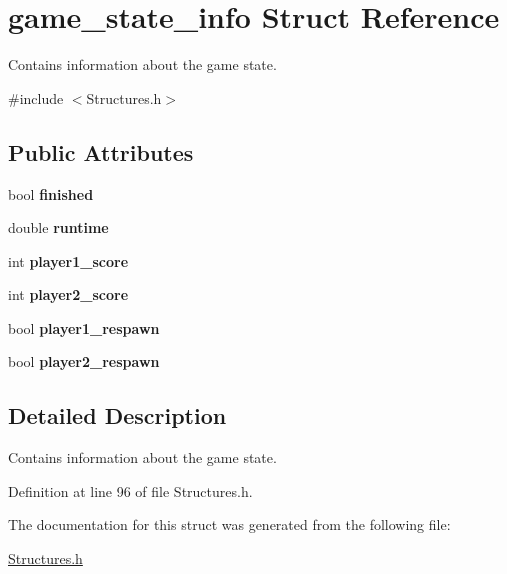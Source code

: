 \hypertarget{structgame__state__info}{\section{game\+\_\+state\+\_\+info Struct Reference}
\label{structgame__state__info}
}


Contains information about the game state.  




{\ttfamily \#include $<$Structures.\+h$>$}

\subsection*{Public Attributes}
\begin{DoxyCompactItemize}
\item 
\hypertarget{structgame__state__info_a5b4e6baa76c6df97aeffc8621baec2d4}{bool {\bfseries finished}}\label{structgame__state__info_a5b4e6baa76c6df97aeffc8621baec2d4}

\item 
\hypertarget{structgame__state__info_ac601ae590859dff59da88a221761a1f2}{double {\bfseries runtime}}\label{structgame__state__info_ac601ae590859dff59da88a221761a1f2}

\item 
\hypertarget{structgame__state__info_ad1d0950a104fa3def5a1f259a3c0914c}{int {\bfseries player1\+\_\+score}}\label{structgame__state__info_ad1d0950a104fa3def5a1f259a3c0914c}

\item 
\hypertarget{structgame__state__info_a16292b25dcb66803f6eeecf8779c5edd}{int {\bfseries player2\+\_\+score}}\label{structgame__state__info_a16292b25dcb66803f6eeecf8779c5edd}

\item 
\hypertarget{structgame__state__info_a6ece578c6ce78f5f2d71b55f1678bb22}{bool {\bfseries player1\+\_\+respawn}}\label{structgame__state__info_a6ece578c6ce78f5f2d71b55f1678bb22}

\item 
\hypertarget{structgame__state__info_ac2783a12bd611e0873284e0c4dd5fcf4}{bool {\bfseries player2\+\_\+respawn}}\label{structgame__state__info_ac2783a12bd611e0873284e0c4dd5fcf4}

\end{DoxyCompactItemize}


\subsection{Detailed Description}
Contains information about the game state. 

Definition at line 96 of file Structures.\+h.



The documentation for this struct was generated from the following file\+:\begin{DoxyCompactItemize}
\item 
\hyperlink{_structures_8h}{Structures.\+h}\end{DoxyCompactItemize}
